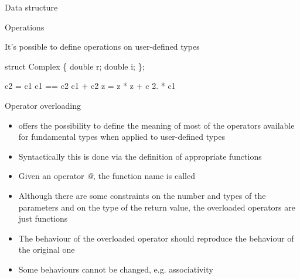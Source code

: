 \begin{frame}[fragile]{Data structure}
  \vskip -0.3cm


\end{frame}

\begin{frame}[fragile]{Operations}

  It's possible to define operations on user-defined types

  \begin{codeblock}
struct Complex \{
  double r;
  double i;
\};



c2 \alert<2>{=} c1
c1 \alert<3-4>{==} c2
c1 \alert<5-6>{+} c2
z = z * z + c
2. * c1
\ddd\end{codeblock}


\end{frame}

\begin{frame}[fragile]{Operator overloading}


  \begin{itemize}[<+->]
  \item \Cpp{} offers the possibility to define the meaning of most of the
    operators available for fundamental types when applied to user-defined types
  \item Syntactically this is done via the definition of appropriate functions
  \item Given an operator \textit{@}, the function name is called
  \item Although there are some constraints on the number and types of the
    parameters and on the type of the return value, the overloaded operators
    are just functions
  \item The behaviour of the overloaded operator should reproduce the behaviour
    of the original one
  \item Some behaviours cannot be changed, e.g. associativity
  \end{itemize}

\end{frame}

